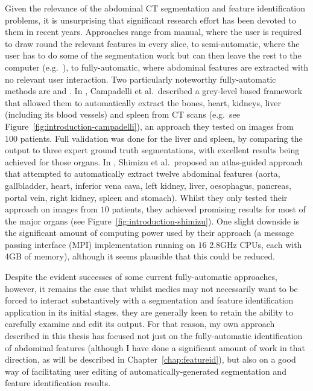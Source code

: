 Given the relevance of the abdominal CT segmentation and feature identification problems, it is unsurprising that significant research effort has been devoted to them in recent years. Approaches range from manual, where the user is required to draw round the relevant features in every slice, to semi-automatic, where the user has to do some of the segmentation work but can then leave the rest to the computer (e.g.~\cite{loncaric00}), to fully-automatic, where abdominal features are extracted with no relevant user interaction. Two particularly noteworthy fully-automatic methods are \cite{campadelli09} and \cite{shimizu07}. In \cite{campadelli09}, Campadelli et al.\ described a grey-level based framework that allowed them to automatically extract the bones, heart, kidneys, liver (including its blood vessels) and spleen from CT scans (e.g.~see Figure~\ref{fig:introduction-campadelli}), an approach they tested on images from $100$ patients. Full validation was done for the liver and spleen, by comparing the output to three expert ground truth segmentations, with excellent results being achieved for those organs. In \cite{shimizu07}, Shimizu et al.\ proposed an atlas-guided approach that attempted to automatically extract twelve abdominal features (aorta, gallbladder, heart, inferior vena cava, left kidney, liver, oesophagus, pancreas, portal vein, right kidney, spleen and stomach). Whilst they only tested their approach on images from $10$ patients, they achieved promising results for most of the major organs (see Figure~\ref{fig:introduction-shimizu}). One slight downside is the significant amount of computing power used by their approach (a message passing interface (MPI) implementation running on $16$ 2.8GHz CPUs, each with 4GB of memory), although it seems plausible that this could be reduced.


Despite the evident successes of some current fully-automatic approaches, however, it remains the case that whilst medics may not necessarily want to be forced to interact substantively with a segmentation and feature identification application in its initial stages, they are generally keen to retain the ability to carefully examine and edit its output. For that reason, my own approach described in this thesis has focused not just on the fully-automatic identification of abdominal features (although I have done a significant amount of work in that direction, as will be described in Chapter~\ref{chap:featureid}), but also on a good way of facilitating user editing of automatically-generated segmentation and feature identification results.

